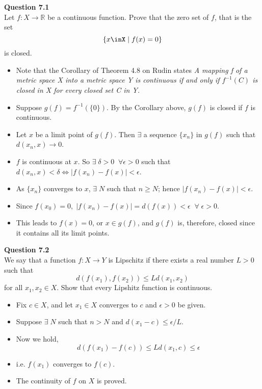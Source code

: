 \documentclass[12pt]{article}
\begin{document}



\textbf{Question 7.1}\\
Let $f\colon X\rightarrow \mathbb{R}$ be a continuous function. Prove that the zero set of $f$, that is the set 
$$\{x\inX\;|\;f(x)=0\}$$ is closed.
\begin{itemize}
    \item Note that the Corollary of Theorem 4.8 on Rudin states {\sl A mapping f of a metric space X into a metric space Y is continuous if and only if $f^{-1}(C)$ is closed in X for every closed set C in Y.}
    \item Suppose $g(f) = f^{-1}(\{0\})$. By the Corollary above, $g(f)$ is closed if $f$ is continuous.\\
    
    \item Let $x$ be a limit point of $g(f)$. Then $\exists$ a sequence $\{x_n\}$ in $g(f)$ such that $d(x_n,x)\rightarrow 0$.
    \item $f$ is continuous at $x$. So $\exists\; \delta>0\;\;\forall \epsilon>0$ such that $d(x_n,x)<\delta \Leftrightarrow |f(x_n)-f(x)|<\epsilon$.
    \item As $\{x_n\}$ converges to $x$, $\exists\; N$ such that $n\ge N$; hence $|f(x_n)-f(x)|<\epsilon$.
    \item Since $f(x_0)=0,\; |f(x_n)-f(x)| = d(f(x)) < \epsilon \;\;\forall\; \epsilon>0.$
    \item This leads to $f(x) = 0$, or $x\in g(f)$, and $g(f)$ is, therefore, closed since it contains all its limit points.
    
\end{itemize}


\vspace{1.5\baselineskip}
\textbf{Question 7.2}\\
We say that a function $f\colon X\rightarrow Y$ is Lipschitz if there exists a real number $L>0$ such that 
$$d(f(x_1),f(x_2))\le Ld(x_1,x_2)$$ for all $x_1,x_2\in X$.
Show that every Lipshitz function is continuous.
\begin{itemize}
    \item Fix $c\in X$, and let $x_1\in X$ converges to $c$ and $\epsilon>0$ be given.
    \item Suppose $\exists\; N$ such that $n>N$ and $d(x_1 - c) \le \epsilon / L$.
    \item Now we hold, $$d(f(x_1)-f(c)) \le Ld(x_1,c)\le \epsilon$$
    \item i.e. $f(x_1)$ converges to $f(c)$.
    \item The continuity of $f$ on $X$ is proved.
\end{itemize}
\end{document}
